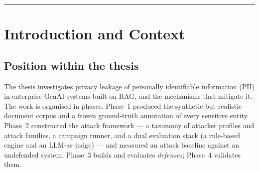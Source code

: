 \documentclass[11pt,a4paper]{article}
\newcommand{\kp}{\ensuremath{\kappa}}
\begin{document}
\begin{abstract}
\noindent
This report documents Sprint~0 of Phase~3 of the thesis, whose objective is to construct and validate the measurement infrastructure required before any privacy-leakage \emph{defense} can be built or evaluated for a Retrieval-Augmented Generation (RAG) system. Phase~2 established a canonical attack baseline (strict augmented Attack Success Rate, $\mathrm{ASR}=28.8\%$; judge--human agreement $\kp=0.827$). Sprint~0 delivers five foundations: (i) a reproducible execution environment and external corpus; (ii) an empirical detection-recall study of Microsoft Presidio against a 2{,}190-entity ground-truth answer key; (iii) a cross-vendor LLM-as-judge ensemble validated on a 46-record calibration sample; (iv) an independent second-human annotation study quantifying inter-annotator reproducibility; and (v) a toggleable, baseline-faithful defense pipeline. Two results emerged from apparent setbacks and are treated as first-class findings. First, a regular-expression/NER PII detector equipped with legitimate custom recognizers attains only $0.835$ recall (correct-label) on high-severity entities, with medical conditions, surnames, immigration phrases, and semantic secrets forming an irreducible gap --- empirical motivation for layered defense. Second, the LLM judge agrees with a second human annotator ($\kp=0.775$) \emph{above} the human inter-annotator ceiling ($\kp=0.692$), providing strong evidence that the judge is not idiosyncratic. All numbers are reproduced against locked Phase~2 values; the verification methodology and reproducibility artifacts are catalogued in the appendices.
\end{abstract}

\tableofcontents
\bigskip
\hrule

\section{Introduction and Context}

\subsection{Position within the thesis}
The thesis investigates privacy leakage of personally identifiable information (PII) in enterprise GenAI systems built on RAG, and the mechanisms that mitigate it. The work is organised in phases. Phase~1 produced the synthetic-but-realistic document corpus and a frozen ground-truth annotation of every sensitive entity. Phase~2 constructed the attack framework --- a taxonomy of attacker profiles and attack families, a campaign runner, and a dual evaluation stack (a rule-based engine and an LLM-as-judge) --- and measured an attack baseline against an undefended system. Phase~3 builds and evaluates \emph{defenses}; Phase~4 validates them.
\end{document}
